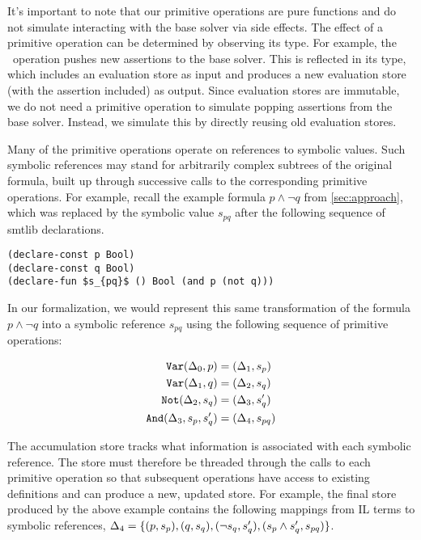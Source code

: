 It's important to note that our primitive operations are pure functions and do
not simulate interacting with the base solver via side effects. The effect of a
primitive operation can be determined by observing its type. For example, the
\passert\ operation pushes new assertions to the base solver. This is reflected
in its type, which includes an evaluation store as input and produces a new
evaluation store (with the assertion included) as output.
%
Since evaluation stores are immutable, we do not need a primitive operation to
simulate popping assertions from the base solver. Instead, we simulate this by
directly reusing old evaluation stores.


Many of the primitive operations operate on references to symbolic values. Such
symbolic references may stand for arbitrarily complex subtrees of the original
formula, built up through successive calls to the corresponding primitive
operations.
%
For example, recall the example formula $p\wedge\neg q$ from
\autoref{sec:approach}, which was replaced by the symbolic value $s_{pq}$ after
the following sequence of \acs{smtlib} declarations.
%
\begin{lstlisting}[columns=flexible,keepspaces=true]
(declare-const p Bool)
(declare-const q Bool)
(declare-fun $s_{pq}$ () Bool (and p (not q)))
\end{lstlisting}
%
In our formalization, we would represent this same transformation of the
formula $p\wedge\neg q$ into a symbolic reference $s_{pq}$ using the
following sequence of primitive operations:

\vspace{-2ex}
{\footnotesize
\begin{align*}
\texttt{Var}(\Delta_{0}, p)       &= (\Delta_{1}, s_p) \\
\texttt{Var}(\Delta_{1}, q)       &= (\Delta_{2}, s_q) \\
\texttt{Not}(\Delta_{2}, s_q)       &= (\Delta_{3}, s_q') \\
\texttt{And}(\Delta_{3}, s_p, s_q') &= (\Delta_{4}, s_{pq})
\end{align*}}%

\noindent
%
The accumulation store tracks what information is associated with each symbolic
reference. The store must therefore be threaded through the calls to each
primitive operation so that subsequent operations have access to existing
definitions and can produce a new, updated store.
%
For example, the final store produced by the above example contains the
following mappings from IL terms to symbolic references,
$\aStore{4}=\set{(p,s_p),(q,s_q),(\neg s_q,s_q'),(s_p\wedge s_q',s_{pq})}$.


